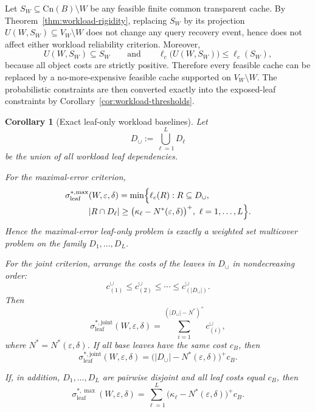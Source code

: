 \documentclass[journal]{IEEEtran}
\makeatletter
\newcommand{\Cn}{\text{Cn}}
\newtheorem{corollary}{Corollary}[section]
\numberwithin{equation}{section}
\renewenvironment{proof}[1][\proofname]{\par
  \pushQED{\qed}%
  \normalfont \topsep6\p@\@plus6\p@\relax
  \trivlist
  \item[\hskip\labelsep
        \itshape
    #1\@addpunct{.}]\ignorespaces
}{%
  \popQED\endtrivlist\@endpefalse
}
\makeatother
\begin{document}
\begin{proof}
Let \(S_W\subseteq\Cn(B)\setminus W\) be any feasible finite common transparent
cache.  By Theorem~\ref{thm:workload-rigidity}, replacing \(S_W\) by its
projection \(U(W,S_W)\subseteq V_W\setminus W\) does not change any query
recovery event, hence does not affect either workload reliability criterion.
Moreover,
\[
  U(W,S_W)\subseteq S_W
  \qquad\text{and}\qquad
  \ell_c\bigl(U(W,S_W)\bigr)\le \ell_c(S_W),
\]
because all object costs are strictly positive.  Therefore every feasible cache
can be replaced by a no-more-expensive feasible cache supported on
\(V_W\setminus W\).  The probabilistic constraints are then converted exactly
into the exposed-leaf constraints by Corollary~\ref{cor:workload-thresholds}.
\end{proof}

\begin{corollary}[Exact leaf-only workload baselines]
\label{cor:workload-leaf-baselines}
Let
\[
  D_{\cup}:=\bigcup_{\ell=1}^{L}D_\ell
\]
be the union of all workload leaf dependencies.

For the maximal-error criterion,
\begin{align}
  \sigma_{\mathrm{leaf}}^{*,\max}
  &(W,\varepsilon,\delta)
  =
  \min\Bigl\{
    \ell_c(R):
    R\subseteq D_{\cup},
    \nonumber\\[-1mm]
    &|R\cap D_\ell|
      \ge
      \bigl(\kappa_\ell-N^*(\varepsilon,\delta)\bigr)^+,
      \ \ell=1,\ldots,L
  \Bigr\}.
\label{eq:workload-leaf-opt-max}
\end{align}
Hence the maximal-error leaf-only problem is exactly a weighted set multicover
problem on the family \(D_1,\ldots,D_L\).

For the joint criterion, arrange the costs of the leaves in \(D_{\cup}\) in
nondecreasing order:
\[
  c_{(1)}^{\cup}\le c_{(2)}^{\cup}\le\cdots\le c_{(|D_{\cup}|)}^{\cup}.
\]
Then
\begin{equation}
  \sigma_{\mathrm{leaf}}^{*,\mathrm{joint}}
  (W,\varepsilon,\delta)
  =
  \sum_{i=1}^{(|D_{\cup}|-N^*)^+}
  c_{(i)}^{\cup},
\label{eq:workload-leaf-opt-joint}
\end{equation}
where \(N^*=N^*(\varepsilon,\delta)\).  If all base leaves have the same cost
\(c_B\), then
\begin{equation}
  \sigma_{\mathrm{leaf}}^{*,\mathrm{joint}}
  (W,\varepsilon,\delta)
  =
  \bigl(|D_{\cup}|-N^*(\varepsilon,\delta)\bigr)^+c_B.
\label{eq:workload-leaf-opt-joint-hom}
\end{equation}

If, in addition, \(D_1,\ldots,D_L\) are pairwise disjoint and all leaf costs
equal \(c_B\), then
\begin{equation}
  \sigma_{\mathrm{leaf}}^{*,\max}
  (W,\varepsilon,\delta)
  =
  \sum_{\ell=1}^{L}
  \bigl(\kappa_\ell-N^*(\varepsilon,\delta)\bigr)^+c_B.
\label{eq:workload-leaf-opt-max-disjoint}
\end{equation}
\end{corollary}
\end{document}
